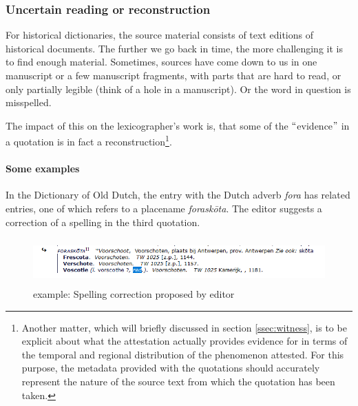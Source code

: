 \documentclass[10pt]{article}
\begin{document}
\subsubsection*{Uncertain reading or reconstruction}


For historical dictionaries, the source material consists of text editions of historical documents. The further we go back in time, the more challenging it is to find enough material. Sometimes, sources have come down to us in one manuscript or a few manuscript fragments, with parts that are hard to read, or only partially legible (think of a hole in a manuscript). Or the word in question is misspelled.\par


The impact of this on the lexicographer’s work is, that some of the $``$evidence$"$  in a quotation is in fact a reconstruction\footnote{Another matter, which will briefly discussed in section \ref{ssec:witness}, is to be explicit about what the attestation actually provides evidence for in terms of the temporal and regional distribution of the phenomenon attested. For this purpose, the metadata provided with the quotations should accurately represent the nature of the source text from which the quotation has been taken.}.\par



\paragraph*{Some examples}

 In the Dictionary of Old Dutch, the entry with the Dutch adverb \textit{fora }has related entries, one of which refers to a placename \textit{foraskōta}. The editor suggests a correction of a spelling in the third quotation.\par




\begin{figure}[H]
	\begin{Center}
		\includegraphics[width=6.27in,height=0.69in]{./image18.png}
	\end{Center}
	\caption{example: Spelling correction proposed by editor}
\end{figure}
\end{document}
